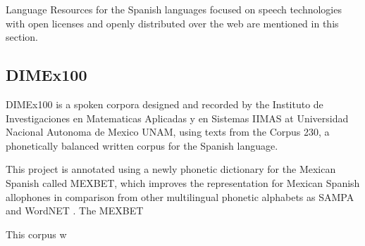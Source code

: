 \documentclass{article}
\begin{document}
Language Resources for the Spanish languages focused on speech technologies with open licenses and openly distributed over the web are mentioned in this section. 

\subsection{DIMEx100}

DIMEx100 is a spoken corpora designed and recorded  by the Instituto de Investigaciones en Matematicas Aplicadas y en Sistemas IIMAS at Universidad Nacional Autonoma de Mexico UNAM, using texts from the Corpus 230\cite{Corpus230}, a phonetically balanced written corpus for the Spanish language. 

This project is annotated using a newly phonetic dictionary for the Mexican Spanish called MEXBET, which improves the representation for Mexican Spanish allophones in comparison from other multilingual phonetic alphabets as SAMPA and WordNET \cite{mexbet}. The MEXBET 

This corpus w
\end{document}
